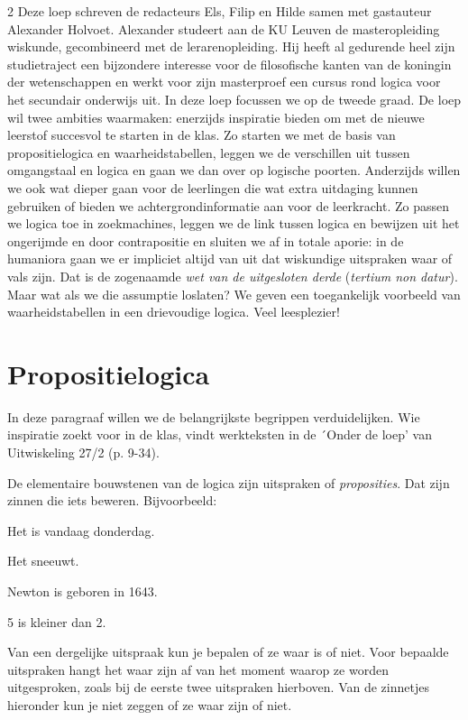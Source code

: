 \begin{multicols}{2}
Deze loep schreven de redacteurs Els, Filip en Hilde samen met gastauteur Alexander Holvoet. Alexander studeert aan de KU Leuven de masteropleiding wiskunde, gecombineerd met de lerarenopleiding. Hij heeft al gedurende heel zijn studietraject een bijzondere interesse voor de filosofische kanten van de koningin der wetenschappen en werkt voor zijn masterproef een cursus rond logica voor het secundair onderwijs uit. In deze loep focussen we op de tweede graad. De loep wil twee ambities waarmaken: enerzijds inspiratie bieden om met de nieuwe leerstof succesvol te starten in de klas. Zo starten we met de basis van propositielogica en waarheidstabellen, leggen we de verschillen uit tussen omgangstaal en logica en gaan we dan over op logische poorten. Anderzijds willen we ook wat dieper gaan voor de leerlingen die wat extra uitdaging kunnen gebruiken of bieden we achtergrondinformatie aan voor de leerkracht. Zo passen we logica toe in zoekmachines, leggen we de link tussen logica en bewijzen uit het ongerijmde en door contrapositie en sluiten we af in totale aporie: in de humaniora gaan we er impliciet altijd van uit dat wiskundige uitspraken waar of vals zijn. Dat is de zogenaamde \textit{wet van de uitgesloten derde} (\textit{tertium non datur}). Maar wat als we die assumptie loslaten? We geven een toegankelijk voorbeeld van waarheidstabellen in een drievoudige logica. Veel leesplezier!


\section{Propositielogica}

In deze paragraaf willen we de belangrijkste begrippen verduidelijken. Wie inspiratie zoekt voor in de klas, vindt werkteksten in de ´Onder de loep' van Uitwiskeling 27/2 (p. 9-34). 

De elementaire bouwstenen van de logica zijn uitspraken of \emph{proposities}. Dat zijn zinnen die iets beweren. Bijvoorbeeld:

\begin{opsomming}                                     
\item Het is vandaag donderdag.
\item Het sneeuwt.
\item Newton is geboren in 1643.
\item 5 is kleiner dan 2.
\end{opsomming}

Van een dergelijke uitspraak kun je bepalen of ze waar is of niet. Voor bepaalde uitspraken hangt het waar zijn af van het moment waarop ze worden uitgesproken, zoals bij de eerste twee uitspraken hierboven. Van de zinnetjes hieronder kun je niet zeggen of ze waar zijn of niet.


\end{multicols}
